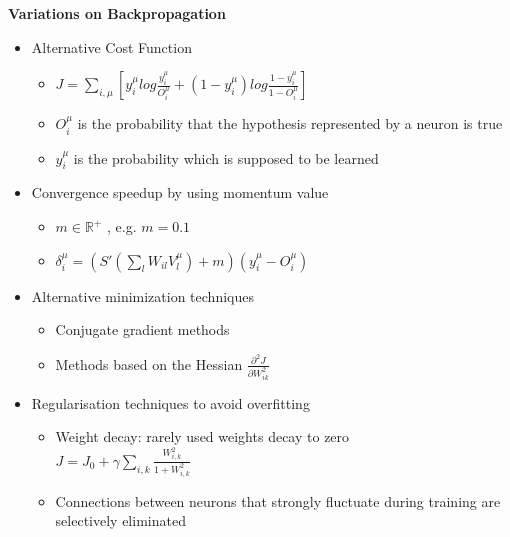 \documentclass[main]{subfiles}
\begin{document}
\textbf{Variations on Backpropagation}
\begin{itemize}
\item Alternative Cost Function
\begin{itemize}[label={$\circ$}]
\item $J=\sum_{i,\mu}[y^{\mu}_ilog\frac{y_i^{\mu}}{O_i^{\mu}}+(1-y_i^{\mu})log\frac{1-y_i^{\mu}}{1-O_i^{\mu}}]$
\item $O_i^{\mu}$ is the probability that the hypothesis represented by a neuron is true
\item $y_i^{\mu}$ is the probability which is supposed to be learned
\end{itemize}
\item Convergence speedup by using momentum value
\begin{itemize}[label={$\circ$}]
\item $m \in \mathbb{R}^+$ , e.g. $m = 0.1$
\item $\delta_i^{\mu}=(S'(\sum_lW_{il}V_l^{\mu})+m)(y_i^{\mu}-O_i^{\mu})$\end{itemize}
\item Alternative minimization techniques \begin{itemize}[label={$\circ$}]
\item Conjugate gradient methods
\item Methods based on the Hessian $\frac{\partial^2J}{\partial W^2_{ik}}$
\end{itemize}
\item Regularisation techniques to avoid overfitting
\begin{itemize}[label={$\circ$}]
\item Weight decay: rarely used weights decay to zero \\$J=J_0+\gamma\sum_{i,k}\frac{W_{i,k}^2}{1+W_{i,k}^2}$
\item Connections between neurons that strongly fluctuate during training are selectively eliminated
\end{itemize}
\end{itemize}
\end{document}
